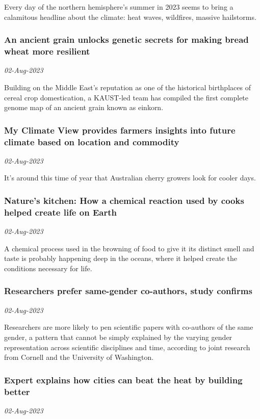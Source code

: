 Every day of the northern hemisphere's summer in 2023 seems to bring a calamitous headline about the climate: heat waves, wildfires, massive hailstorms.
\subsubsection{An ancient grain unlocks genetic secrets for making bread wheat more resilient \href{https://phys.org/news/2023-08-ancient-grain-genetic-secrets-bread.html}{}}
\textit{02-Aug-2023}

Building on the Middle East's reputation as one of the historical birthplaces of cereal crop domestication, a KAUST-led team has compiled the first complete genome map of an ancient grain known as einkorn.
\subsubsection{My Climate View provides farmers insights into future climate based on location and commodity \href{https://phys.org/news/2023-08-climate-view-farmers-insights-future.html}{}}
\textit{02-Aug-2023}

It's around this time of year that Australian cherry growers look for cooler days.
\subsubsection{Nature's kitchen: How a chemical reaction used by cooks helped create life on Earth \href{https://phys.org/news/2023-08-nature-kitchen-chemical-reaction-cooks.html}{}}
\textit{02-Aug-2023}

A chemical process used in the browning of food to give it its distinct smell and taste is probably happening deep in the oceans, where it helped create the conditions necessary for life.
\subsubsection{Researchers prefer same-gender co-authors, study confirms \href{https://phys.org/news/2023-08-same-gender-co-authors.html}{}}
\textit{02-Aug-2023}

Researchers are more likely to pen scientific papers with co-authors of the same gender, a pattern that cannot be simply explained by the varying gender representation across scientific disciplines and time, according to joint research from Cornell and the University of Washington.
\subsubsection{Expert explains how cities can beat the heat by building better \href{https://phys.org/news/2023-08-expert-cities.html}{}}
\textit{02-Aug-2023}

